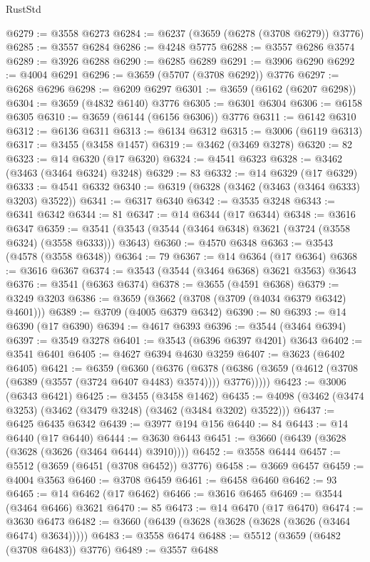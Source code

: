 \begin{lexlean}{RustStd}
\begin{coremodule}
@6279 := @3558 @6273
@6284 := @6237 (@3659 (@6278 (@3708 @6279)) @3776)
@6285 := @3557 @6284
@6286 := @4248 @5775
@6288 := @3557 @6286 @3574
@6289 := @3926 @6288
@6290 := @6285 @6289
@6291 := @3906 @6290
@6292 := @4004 @6291
@6296 := @3659 (@5707 (@3708 @6292)) @3776
@6297 := @6268 @6296
@6298 := @6209 @6297
@6301 := @3659 (@6162 (@6207 @6298))
@6304 := @3659 (@4832 @6140) @3776
@6305 := @6301 @6304
@6306 := @6158 @6305
@6310 := @3659 (@6144 (@6156 @6306)) @3776
@6311 := @6142 @6310
@6312 := @6136 @6311
@6313 := @6134 @6312
@6315 := @3006 (@6119 @6313)
@6317 := @3455 (@3458 @1457)
@6319 := @3462 (@3469 @3278)
@6320 := 82
@6323 := @14 @6320 (@17 @6320)
@6324 := @4541 @6323
@6328 := @3462 (@3463 (@3464 @6324) @3248)
@6329 := 83
@6332 := @14 @6329 (@17 @6329)
@6333 := @4541 @6332
@6340 := @6319 (@6328 (@3462 (@3463 (@3464 @6333) @3203) @3522))
@6341 := @6317 @6340
@6342 := @3535 @3248
@6343 := @6341 @6342
@6344 := 81
@6347 := @14 @6344 (@17 @6344)
@6348 := @3616 @6347
@6359 := @3541 (@3543 (@3544 (@3464 @6348) @3621 (@3724 (@3558 @6324) (@3558 @6333))) @3643)
@6360 := @4570 @6348
@6363 := @3543 (@4578 (@3558 @6348))
@6364 := 79
@6367 := @14 @6364 (@17 @6364)
@6368 := @3616 @6367
@6374 := @3543 (@3544 (@3464 @6368) @3621 @3563) @3643
@6376 := @3541 (@6363 @6374)
@6378 := @3655 (@4591 @6368)
@6379 := @3249 @3203
@6386 := @3659 (@3662 (@3708 (@3709 (@4034 @6379 @6342) @4601)))
@6389 := @3709 (@4005 @6379 @6342)
@6390 := 80
@6393 := @14 @6390 (@17 @6390)
@6394 := @4617 @6393
@6396 := @3544 (@3464 @6394)
@6397 := @3549 @3278
@6401 := @3543 (@6396 @6397 @4201) @3643
@6402 := @3541 @6401
@6405 := @4627 @6394 @4630 @3259
@6407 := @3623 (@6402 @6405)
@6421 := @6359
    (@6360
      (@6376
        (@6378 (@6386 (@3659 (@4612 (@3708 (@6389 (@3557 (@3724 @6407 @4483) @3574)))) @3776)))))
@6423 := @3006 (@6343 @6421)
@6425 := @3455 (@3458 @1462)
@6435 := @4098 (@3462 (@3474 @3253) (@3462 (@3479 @3248) (@3462 (@3484 @3202) @3522)))
@6437 := @6425 @6435 @6342
@6439 := @3977 @194 @156
@6440 := 84
@6443 := @14 @6440 (@17 @6440)
@6444 := @3630 @6443
@6451 := @3660 (@6439 (@3628 (@3628 (@3626 (@3464 @6444) @3910))))
@6452 := @3558 @6444
@6457 := @5512 (@3659 (@6451 (@3708 @6452)) @3776)
@6458 := @3669 @6457
@6459 := @4004 @3563
@6460 := @3708 @6459
@6461 := @6458 @6460
@6462 := 93
@6465 := @14 @6462 (@17 @6462)
@6466 := @3616 @6465
@6469 := @3544 (@3464 @6466) @3621
@6470 := 85
@6473 := @14 @6470 (@17 @6470)
@6474 := @3630 @6473
@6482 := @3660 (@6439 (@3628 (@3628 (@3628 (@3626 (@3464 @6474) @3634)))))
@6483 := @3558 @6474
@6488 := @5512 (@3659 (@6482 (@3708 @6483)) @3776)
@6489 := @3557 @6488

\end{coremodule}
\end{lexlean}
